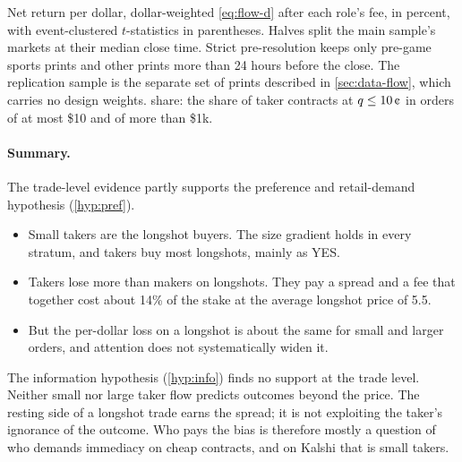 \begin{table}[htbp]
\begin{threeparttable}
\begin{tablenotes}
\item Net return per dollar, dollar-weighted \eqref{eq:flow-d} after each role's fee, in
percent, with event-clustered $t$-statistics in parentheses. Halves split the main sample's
markets at their median close time. Strict pre-resolution keeps only pre-game sports prints and
other prints more than 24 hours before the close. The replication sample is the separate set
of prints described in \cref{sec:data-flow}, which carries no design weights. \LS{} share: the
share of taker contracts at $\q\le10\cents$ in orders of at most \$10 and of more than \$1k.
\end{tablenotes}
\end{threeparttable}
\end{table}

\paragraph{Summary.} The trade-level evidence partly supports the preference and retail-demand
hypothesis (\cref{hyp:pref}).
\begin{itemize}
  \item Small takers are the longshot buyers. The size gradient holds in every stratum, and
  takers buy most longshots, mainly as YES.
  \item Takers lose more than makers on longshots. They pay a spread and a fee that together
  cost about 14\% of the stake at the average longshot price of 5.5\cents.
  \item But the per-dollar loss on a longshot is about the same for small and larger orders, and
  attention does not systematically widen it.
\end{itemize}
The information hypothesis (\cref{hyp:info}) finds no support at the trade level. Neither small
nor large taker flow predicts outcomes beyond the price. The resting side of a longshot trade
earns the spread; it is not exploiting the taker's ignorance of the outcome. Who pays the bias is
therefore mostly a question of who demands immediacy on cheap contracts, and on Kalshi that is
small takers.
